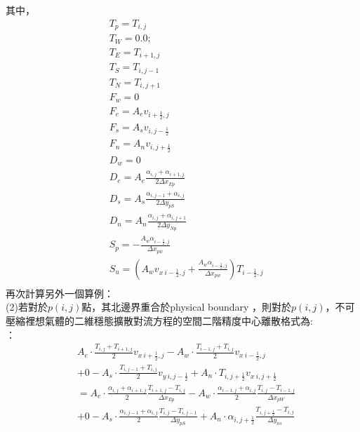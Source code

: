 \documentclass[12pt]{article}
\begin{document}
\vspace{-0.7em}
\noindent 其中，
\begin{equation}
  \begin{split}
    &T_{p} = T_{i,j}\\
    &T_{W} = 0.0 ;\\
    &T_{E} = T_{i+1,j} \\
    &T_{S} = T_{i,j-1} \\
    &T_{N} = T_{i,j+1}\\
    &F_{w} = 0 \\
    &F_{e} = A_{e}v_{i+\frac{1}{2},j}\\
    &F_{s} = A_{s}v_{i,j-\frac{1}{2}}\\
    &F_{n} = A_{n}v_{i,j+\frac{1}{2}}\\
    &D_{w} = 0\\
    &D_{e} = A_{e} \frac{\alpha_{i,j}+\alpha_{i+1,j}}{2\Delta x_{Ep}}\\
    &D_{s} = A_{s} \frac{\alpha_{i,j-1}+\alpha_{i,j}}{2\Delta y_{pS}}\\
    &D_{n} = A_{n} \frac{\alpha_{i,j}+\alpha_{i,j+1}}{2\Delta y_{Np}}\\
    &S_{p} = -\frac{A_{w}\alpha_{i-\frac{1}{2},j}}{\Delta x_{pw}}\\
    &S_{u} = (A_{w} v_{x\ i-\frac{1}{2},j} + \frac{A_{w}\alpha_{i-\frac{1}{2},j}}{\Delta x_{pw}})T_{i-\frac{1}{2},j}\\
  \end{split}
\end{equation}
\noindent 再次計算另外一個算例：\\
(2)若對於$p(i,j)$點，其北邊界重合於physical boundary ，則對於$p(i,j)$，不可壓縮裡想氣體的二維穩態擴散對流方程的空間二階精度中心離散格式為:\\
\noindent [通用式]： 
\begin{equation}
\begin{split}
  &A_{e} \cdot \frac{T_{i,j} + T_{i+1,j}}{2} v_{x\ i+\frac{1}{2},j} - A_{w} \cdot \frac{T_{i-1,j} + T_{i,j}}{2} v_{x\ i-\frac{1}{2},j} \\
  &+ 0 - A_{s} \cdot \frac{T_{i,j-1} + T_{i,j}}{2} v_{y\ i,j-\frac{1}{2}} + A_{n} \cdot T_{i,j+\frac{1}{2}}v_{x\ i,j+\frac{1}{2}} \\
  &= A_{e} \cdot \frac{\alpha_{i,j} + \alpha_{i+1,j}}{2}\frac{T_{i+1,j}-T_{i,j}}{\Delta x_{Ep}}- A_{w} \cdot \frac{\alpha_{i-1,j} + \alpha_{i,j}}{2}\frac{T_{i,j}-T_{i-1,j}}{\Delta x_{pW}} \\
  &+ 0 - A_{s} \cdot \frac{\alpha_{i,j-1} + \alpha_{i,j}}{2}\frac{T_{i,j}-T_{i,j-1}}{\Delta y_{pS}} + A_{n} \cdot \alpha_{i,j+\frac{1}{2}} \frac{T_{i,j+\frac{1}{2}}-T_{i,j}}{\Delta y_{ns}} \\
\end{split}
\end{equation}
\end{document}
